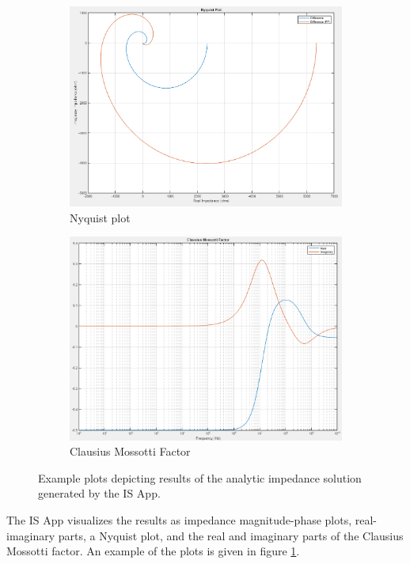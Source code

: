 \begin{figure}[h]
\begin{subfigure}[b]{0.45\textwidth}
        \centering
        \includegraphics[width=\textwidth]{images/IS_APP_Nyquist.png}
        \caption{Nyquist plot}
    \end{subfigure}
    \hfill
    \begin{subfigure}[b]{0.45\textwidth}
        \centering
        \includegraphics[width=\textwidth]{images/IS_APP_FCM.png}
        \caption{Clausius Mossotti Factor}
    \end{subfigure}
    \caption{Example plots depicting results of the analytic impedance solution generated by the IS App.}
    \label{fig:IS_APP_IS_Results}
\end{figure}

\par The IS App visualizes the results as impedance magnitude-phase plots, real-imaginary parts, a Nyquist plot, and the real and imaginary parts of the Clausius Mossotti factor. An example of the plots is given in figure \ref{fig:IS_APP_IS_Results}.

